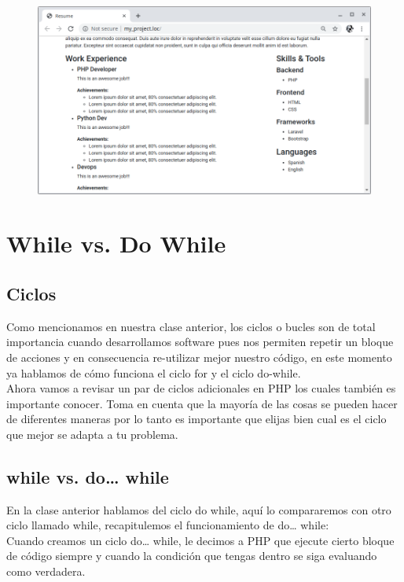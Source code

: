 \documentclass{article}
\begin{document}
\begin{figure}[h!]
  \centering
  \includegraphics[scale=0.5]{./Pictures/032_bucles.png}
\end{figure}


\section{While vs. Do While}%
\subsection*{Ciclos}%
Como mencionamos en nuestra clase anterior, los ciclos o bucles son de total
importancia cuando desarrollamos software pues nos permiten repetir un bloque
de acciones y en consecuencia re-utilizar mejor nuestro código, en este momento
ya hablamos de cómo funciona el ciclo for y el ciclo do-while.\\

Ahora vamos a revisar un par de ciclos adicionales en PHP los cuales también es
importante conocer. Toma en cuenta que la mayoría de las cosas se pueden hacer
de diferentes maneras por lo tanto es importante que elijas bien cual es el
ciclo que mejor se adapta a tu problema.\\

\subsection*{while vs. do… while}%
En la clase anterior hablamos del ciclo do while, aquí lo compararemos con otro
ciclo llamado while, recapitulemos el funcionamiento de do… while:\\

Cuando creamos un ciclo do… while, le decimos a PHP que ejecute cierto bloque
de código siempre y cuando la condición que tengas dentro se siga evaluando
como verdadera.\\
\end{document}
